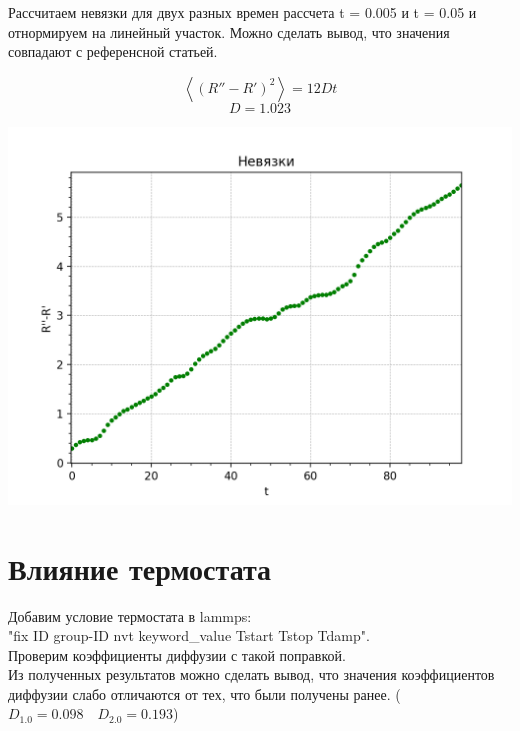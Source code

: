 Рассчитаем невязки для двух разных времен рассчета t = 0.005 и t = 0.05 и отнормируем на линейный участок. Можно сделать вывод, что значения совпадают с референсной статьей. 

 $$\left\langle(R''-R')^2  \right\rangle = 12Dt$$
 $$D = 1.023 $$

 \begin{center}
   

    \includegraphics[width=\linewidth]{name.png}\\
    \end{center} 

\section{Влияние термостата}

Добавим условие термостата в lammps:\\ "fix ID group-ID nvt keyword\_value Tstart Tstop Tdamp".\\
Проверим коэффициенты диффузии с такой поправкой. \\

Из полученных результатов можно сделать вывод, что значения коэффициентов диффузии слабо отличаются от тех, что были получены ранее. ($D_{1.0} = 0.098\quad D_{2.0} = 0.193$)

\newpage


